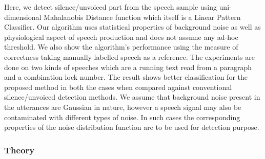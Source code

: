\documentclass[12pt, a4paper, twoside]{report}
\begin{document}
\par
Here, we detect silence/unvoiced part from the speech sample using uni-dimensional Mahalanobis Distance  function which itself is a Linear Pattern Classifier. Our algorithm uses statistical properties of background noise as well as physiological aspect of speech production and does not assume any ad-hoc threshold. We also show the algorithm's performance using the measure of correctness taking manually labelled speech as a reference. The experiments are done on two kinds of speeches which are a running text read from a paragraph and a combination lock number. The result shows better classification for the proposed method in both the cases when compared against conventional silence/unvoiced detection methods. We assume that background noise present in the utterances are Gaussian in nature, however a speech signal may also be contaminated with different types of noise. In such cases the corresponding properties of the noise distribution function are to be used for detection purpose.


\subsubsection{Theory}
\end{document}
